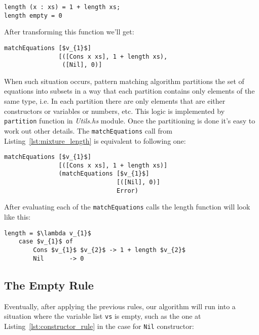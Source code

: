 \documentclass[12pt,a4paper]{report}
\begin{document}
\hspace*{-1.5in}
\begin{lstlisting}
length (x : xs) = 1 + length xs;
length empty = 0
\end{lstlisting}
After transforming this function we'll get:

\hspace*{-1.5in}
\begin{lstlisting}[style=haskell,label=lst:mixture_length, mathescape=true,
  caption={Mixture rule application.}]
matchEquations [$v_{1}$]
               [([Cons x xs], 1 + length xs),
                ([Nil], 0)]
\end{lstlisting}
When such situation occurs, pattern matching algorithm partitions the set of
equations into subsets in a way that each partition contains only elements of
the same type, i.e. In each partition there are only elements that are either
constructors or variables or numbers, etc. This logic is implemented by
\texttt{partition} function in \textit{Utils.hs} module. Once the partitioning
is done it's easy to work out other details. The \texttt{matchEquations} call
from Listing~\ref{lst:mixture_length} is equivalent to following one:

\hspace*{-1.5in}
\begin{lstlisting}[style=haskell,mathescape=true]
matchEquations [$v_{1}$]
               [([Cons x xs], 1 + length xs)]
               (matchEquations [$v_{1}$]
                               [([Nil], 0)]
                               Error)
\end{lstlisting}
After evaluating each of the \texttt{matchEquations} calls the length function
will look like this:

\hspace*{-1.5in}
\begin{lstlisting}[style=haskell,mathescape=true]
length = $\lambda v_{1}$
    case $v_{1}$ of
        Cons $v_{1}$ $v_{2}$ -> 1 + length $v_{2}$
        Nil       -> 0
\end{lstlisting}


\subsection{The Empty Rule}
Eventually, after applying the previous rules, our algorithm will run into a
situation where the variable list \texttt{vs} is empty, such as the one at
Listing~\ref{lst:constructor_rule} in the case for \texttt{Nil} constructor:
\end{document}
